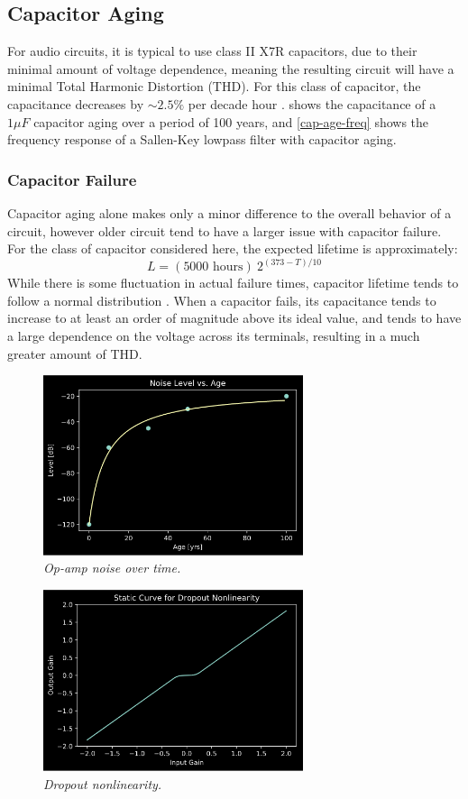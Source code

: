 \documentclass[twoside,a4paper]{article}
\begin{document}
\subsection{Capacitor Aging} \label{sec:cap-age}
%
For audio circuits, it is typical to use class II X7R capacitors, due to
their minimal amount of voltage dependence, meaning the resulting circuit
will have a minimal Total Harmonic Distortion (THD). For this class of
capacitor, the capacitance decreases by $\sim2.5\%$ per decade hour
\cite{cap-aging}.  shows the capacitance of a $1 \mu F$
capacitor aging over a period of 100 years, and \cref{cap-age-freq} shows
the frequency response of a Sallen-Key lowpass filter with capacitor
aging.
%
\subsubsection{Capacitor Failure} \label{sec:cap-fail}
%
Capacitor aging alone makes only a minor difference to the overall
behavior of a circuit, however older circuit tend to have a larger
issue with capacitor failure. For the class of capacitor considered
here, the expected lifetime is approximately:
%
\begin{equation}
    L = (5000 \text{ hours})\ 2^{(373 - T) / 10}
    \label{eq:cap-fail}
\end{equation}
%
While there is some fluctuation in actual failure times, capacitor
lifetime tends to follow a normal distribution \cite{cap-fail}. When
a capacitor fails, its capacitance tends to increase to at least an
order of magnitude above its ideal value, and tends to have a large
dependence on the voltage across its terminals, resulting in a much
greater amount of THD.
%
\begin{figure}[h]
    \center
    \includegraphics[width=3in]{../OpAmp/Pics/age_noise.png}
    \caption{\label{opamp-age-noise}{\it Op-amp noise over time.}}
\end{figure}
%
\begin{figure}[h]
    \center
    \includegraphics[width=3in]{Pics/dropout.png}
    \caption{\label{dropout}{\it Dropout nonlinearity.}}
\end{figure}
%
\end{document}
